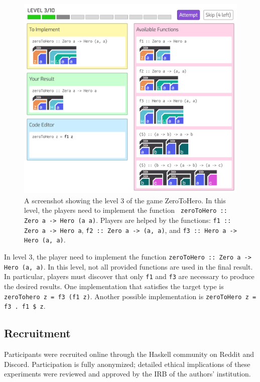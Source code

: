 \documentclass[preprint,12pt]{elsarticle}
\begin{document}
\begin{figure}[!h]
  \includegraphics[width=\linewidth]{figures/Level3}
  \caption{\label{fig:level3} A screenshot showing the level 3 of the game ZeroToHero.  In this level, the players need to implement the function \texttt{ zeroToHero :: Zero a -> Hero (a a)}. Players are helped by the functions: {\tt f1 :: Zero a -> Hero a}, {\tt f2 :: Zero a -> (a, a)}, and {\tt f3 :: Hero a -> Hero (a, a)}.}
\end{figure}


In level 3, the player need to implement the function {\tt zeroToHero :: Zero a -> Hero (a, a)}.  In this level, not all provided functions are used in the final result. In particular,  players must discover that only \texttt{f1} and \texttt{f3} are necessary to produce the desired results. One implementation that satisfies the target type is \texttt{zeroTohero z = f3 (f1 z)}. Another possible implementation is {\tt zeroToHero z = f3 . f1 \$ z}.



\subsection{Recruitment}
Participants were recruited online through the Haskell community on Reddit and Discord. Participation is fully anonymized; detailed ethical implications of these experiments were reviewed and approved by the IRB of the authors' institution.
\end{document}
